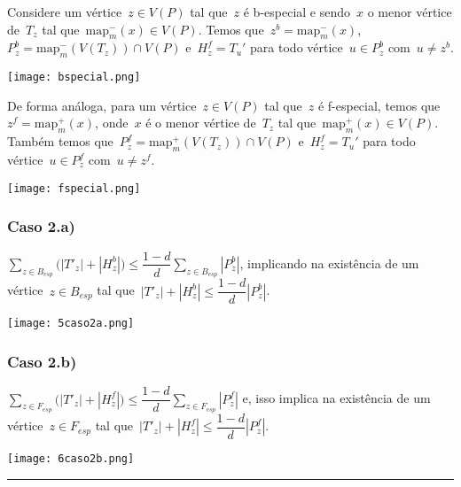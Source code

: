 \documentclass[a0,portrait]{a0poster}
\newcommand{\map}{\mathrm{map}}
\begin{document}
\begin{multicols}{3}
    \bigskip

    Considere um vértice~${z\in V(P)}$ tal que~$z$ é b-especial e
    sendo~$x$ o menor vértice de~$T_z$ tal 
    que~${\map^-_m(x)\in V(P)}$. Temos 
    que~${z^b = \map^-_m(x)}$,
    ~${P_z^b = \map^-_m(V(T_z))\cap V(P)}$
    e~${H_z^f =T_u'}$ para todo 
    vértice~${u\in P_z^b}$ com~${u\ne z^b}$.

    \begin{center}
    \texttt{[image: bspecial.png]}
    \end{center}
    De forma análoga, para um vértice~${z\in V(P)}$ tal 
    que~$z$ é f-especial,
    temos que~${z^f = \map^+_m(x)}$,
    onde~$x$ é o menor vértice de~$T_z$ tal 
    que~${\map^+_m(x)\in V(P)}$.
    Também temos
    que~${P_z^f = \map^+_m(V(T_z))\cap V(P)}$
    e~${H_z^f =T_u'}$ para todo 
    vértice~${u\in P_z^f}$ com~${u\ne z^f}$.

\begin{center}
    \texttt{[image: fspecial.png]}
\end{center}
    \subsubsection*{Caso 2.a)}
        ${\displaystyle\sum_{z\in B_{esp}}
        \Big(|T'_{z}|+|H_z^b|\Big)\le
        \dfrac{1-d}{d}\displaystyle\sum_{z\in B_{esp}}|P_z^b|}$,
        implicando na existência de um vértice~${z\in B_{esp}}$ 
        tal que~${|T'_{z}|+|H_z^b|\le
        \dfrac{1-d}{d}|P_z^b|}$.

\begin{center}
    \texttt{[image: 5caso2a.png]}
\end{center}
    \subsubsection*{Caso 2.b)}
        ${\displaystyle\sum_{z\in F_{esp}}
        \Big(|T'_{z}|+|H_z^f|\Big)\le
        \dfrac{1-d}{d}\displaystyle\sum_{z\in F_{esp}}|P_z^f|}$
        e, isso implica na existência de um vértice~${z\in F_{esp}}$ 
        tal 
        que~${|T'_{z}|+|H_z^f|\le
        \dfrac{1-d}{d}|P_z^f|}$.

\begin{center}
\texttt{[image: 6caso2b.png]}
\end{center}
\noindent\rule[0.5ex]{\linewidth}{1pt}


\end{multicols}
\end{document}
